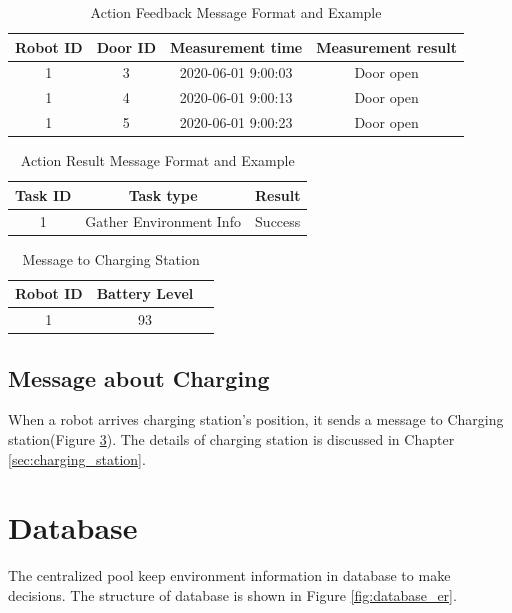 \begin{table}[htb]
\centering
\begin{tabular}{|c|c|c|c|} 
\hline
Robot ID & Door ID & Measurement time & Measurement result \\
\hline\hline
1	& 3	& 2020-06-01 9:00:03 & Door open \\ 
1	& 4	& 2020-06-01 9:00:13 & Door open \\ 
1	& 5	& 2020-06-01 9:00:23 & Door open \\ 
\hline
\end{tabular}
\caption{Action Feedback Message Format and Example}
\label{tab:feedback_message}
\end{table}

\begin{table}[htb]
\centering
\begin{tabular}{|c|c|c|} 
\hline
Task ID 	& Task type	& Result\\
\hline\hline
1 & Gather Environment Info & Success \\ [1ex] 
\hline
\end{tabular}
\caption{Action Result Message Format and Example}
\label{tab:result_message}
\end{table}


\begin{table}[htb]
\centering
\begin{tabular}{|c|c|c|} 
\hline
Robot ID & Battery Level \\
\hline\hline
1 & 93 \\ [1ex] 
\hline
\end{tabular}
\caption{Message to Charging Station}
\label{tab:message_to_charging_staion}
\end{table}

\subsection{Message about Charging}
  
When a robot arrives charging station's position, it sends a message to Charging station(Figure \ref{tab:message_to_charging_staion}). The details of charging station is discussed in Chapter \ref{sec:charging_station}. 

\section{Database}
\label{sec:database}
The centralized pool keep environment information in database to make decisions. The structure of database is shown in Figure \ref{fig:database_er}.

